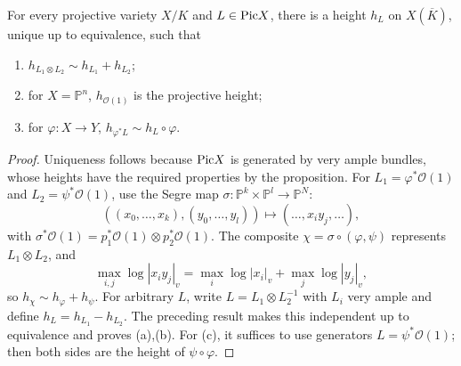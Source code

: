 \begin{theorem}
\label{mumford-thm-weil-height-line-bundle}
For every projective variety $X/K$ and $L\in{\rm Pic}X$, there is a height
$h_L$ on $X(\overline K)$, unique up to equivalence, such that
\begin{enumerate}
\item $h_{L_1\otimes L_2}\sim h_{L_1}+h_{L_2}$;
\item for $X=\mathbb P^n$, $h_{\mathcal O(1)}$ is the projective height;
\item for $\varphi:X\to Y$, $h_{\varphi^*L}\sim h_L\circ\varphi$.
\end{enumerate}
\end{theorem}
\begin{proof}
Uniqueness follows because ${\rm Pic}X$ is generated by very ample bundles,
whose heights have the required properties by the proposition. For
$L_1=\varphi^*\mathcal O(1)$ and $L_2=\psi^*\mathcal O(1)$, use the Segre map
$\sigma:\mathbb P^k\times\mathbb P^l\to\mathbb P^N$:
\[
 ((x_0,\ldots,x_k),(y_0,\ldots,y_l))\mapsto(\ldots,x_iy_j,\ldots),
\]
with
$\sigma^*\mathcal O(1)=p_1^*\mathcal O(1)\otimes p_2^*\mathcal O(1)$.
The composite $\chi=\sigma\circ(\varphi,\psi)$ represents $L_1\otimes L_2$,
and
\[
 \max_{i,j}\log|x_iy_j|_v=\max_i\log|x_i|_v+\max_j\log|y_j|_v,
\]
so $h_\chi\sim h_\varphi+h_\psi$. For arbitrary $L$, write
$L=L_1\otimes L_2^{-1}$ with $L_i$ very ample and define
$h_L=h_{L_1}-h_{L_2}$. The preceding result makes this independent up to
equivalence and proves (a),(b). For (c), it suffices to use generators
$L=\psi^*\mathcal O(1)$; then both sides are the height of
$\psi\circ\varphi$.

\end{proof}



